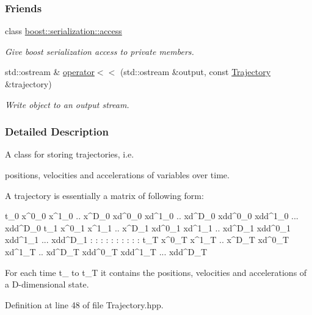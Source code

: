 \subsubsection*{Friends}
\begin{DoxyCompactItemize}
\item 
class \hyperlink{classDmpBbo_1_1Trajectory_ac98d07dd8f7b70e16ccb9a01abf56b9c}{boost\+::serialization\+::access}
\begin{DoxyCompactList}\small\item\em Give boost serialization access to private members. \end{DoxyCompactList}\item 
std\+::ostream \& \hyperlink{classDmpBbo_1_1Trajectory_ab915330172eba3b4cc03473c23598a8a}{operator$<$$<$} (std\+::ostream \&output, const \hyperlink{classDmpBbo_1_1Trajectory}{Trajectory} \&trajectory)
\begin{DoxyCompactList}\small\item\em Write object to an output stream. \end{DoxyCompactList}\end{DoxyCompactItemize}


\subsubsection{Detailed Description}
A class for storing trajectories, i.\+e. 

positions, velocities and accelerations of variables over time.

A trajectory is essentially a matrix of following form\+: \begin{DoxyVerb}t_0   x^0_0 x^1_0 .. x^D_0   xd^0_0 xd^1_0 .. xd^D_0   xdd^0_0 xdd^1_0 ... xdd^D_0
t_1   x^0_1 x^1_1 .. x^D_1   xd^0_1 xd^1_1 .. xd^D_1   xdd^0_1 xdd^1_1 ... xdd^D_1
 :       :     :       :         :      :       :         :       :           :
t_T   x^0_T x^1_T .. x^D_T   xd^0_T xd^1_T .. xd^D_T   xdd^0_T xdd^1_T ... xdd^D_T
\end{DoxyVerb}
 For each time t\+\_ to t\+\_\+\+T it contains the positions, velocities and accelerations of a D-\/dimensional state. 

Definition at line 48 of file Trajectory.\+hpp.



